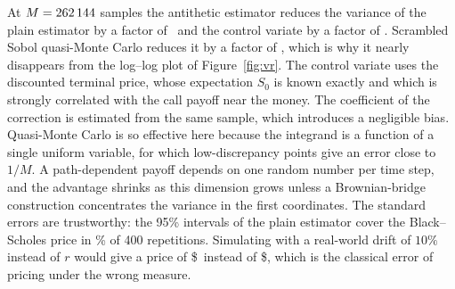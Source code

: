 At $M=262\,144$ samples the antithetic estimator reduces the variance of the plain estimator by a factor of \VRanti\ and the control variate by a factor of \VRcv.
Scrambled Sobol quasi-Monte Carlo reduces it by a factor of \VRsobol, which is why it nearly disappears from the log--log plot of Figure~\ref{fig:vr}.
The control variate uses the discounted terminal price, whose expectation $S_0$ is known exactly and which is strongly correlated with the call payoff near the money.
The coefficient of the correction is estimated from the same sample, which introduces a negligible bias.
Quasi-Monte Carlo is so effective here because the integrand is a function of a single uniform variable, for which low-discrepancy points give an error close to $1/M$.
A path-dependent payoff depends on one random number per time step, and the advantage shrinks as this dimension grows unless a Brownian-bridge construction concentrates the variance in the first coordinates.
The standard errors are trustworthy: the 95\% intervals of the plain estimator cover the Black--Scholes price in \MCcoverage\% of 400 repetitions.
Simulating with a real-world drift of $10\%$ instead of $r$ would give a price of \$\WrongMuPrice\ instead of \$\BSprice, which is the classical error of pricing under the wrong measure.
